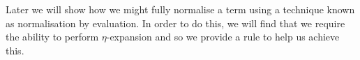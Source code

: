 {\begin{code}
\\
\>[0]\AgdaSpace{}%
\AgdaSpace{}%
\AgdaSpace{}%
\AgdaSpace{}%
\AgdaSymbol{(}\AgdaSymbol{)}\<%
\\
\>[0]\AgdaSpace{}%
\AgdaSpace{}%
\AgdaSpace{}%
\AgdaSpace{}%
\AgdaSymbol{(}\AgdaSymbol{;}\AgdaSpace{}%
\AgdaSymbol{)}\<%
\\
\>[0]\AgdaSpace{}%
\AgdaSpace{}%
\<%
\\
\>[0]\AgdaSpace{}%
\AgdaSpace{}%
\AgdaSpace{}%
\AgdaSpace{}%
\AgdaSymbol{(}\AgdaInductiveConstructor{[]}\AgdaSymbol{;}\AgdaSpace{}%
\AgdaSymbol{)}\<%
\\
\>[0]\AgdaSpace{}%
\AgdaSpace{}%
\AgdaSpace{}%
\AgdaSpace{}%
\AgdaSymbol{(}\AgdaOperator{\AgdaFunction{\AgdaUnderscore{}++\AgdaUnderscore{}}}\AgdaSymbol{)}\<%
\end{code}
}

Later we will show how we might fully normalise a term using a technique
known as normalisation by evaluation. In order to do this, we will find
that we require the ability to perform $η$-expansion and so we provide a
rule to help us achieve this.

